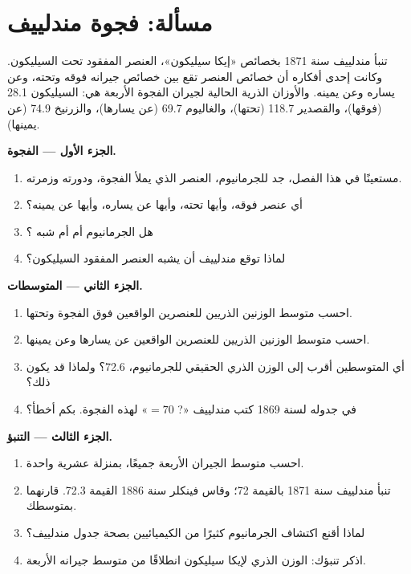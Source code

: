 \section{مسألة: فجوة مندلييف}

\begin{problem}
\label{pb:g9:periodic-table-first-look:1}
تنبأ مندلييف سنة 1871 بخصائص «إيكا سيليكون»، العنصر المفقود تحت السيليكون.
وكانت إحدى أفكاره أن خصائص العنصر تقع بين خصائص جيرانه فوقه وتحته، وعن
يساره وعن يمينه. والأوزان الذرية الحالية لجيران الفجوة الأربعة هي:
السيليكون 28.1 (فوقها)، والقصدير 118.7 (تحتها)، والغاليوم 69.7 (عن
يسارها)، والزرنيخ 74.9 (عن يمينها).

\medskip
\noindent\textbf{الجزء الأول --- الفجوة.}
\begin{enumerate}
  \item مستعينًا  في هذا الفصل، جد  للجرمانيوم،
        العنصر الذي يملأ الفجوة، ودورته
        وزمرته.
  \item أي عنصر فوقه، وأيها تحته، وأيها عن يساره، وأيها عن
        يمينه؟
  \item هل الجرمانيوم  أم  أم شبه ؟
  \item لماذا توقع مندلييف أن يشبه العنصر المفقود
        السيليكون؟
\end{enumerate}

\medskip
\noindent\textbf{الجزء الثاني --- المتوسطات.}
\begin{enumerate}[resume]
  \item احسب متوسط الوزنين الذريين للعنصرين الواقعين فوق الفجوة
        وتحتها.
  \item احسب متوسط الوزنين الذريين للعنصرين الواقعين عن يسارها وعن
        يمينها.
  \item أي المتوسطين أقرب إلى الوزن الذري الحقيقي للجرمانيوم، 72.6؟ ولماذا
        قد يكون ذلك؟
  \item في جدوله لسنة 1869 كتب مندلييف «? $= 70$» لهذه
        الفجوة. بكم أخطأ؟
\end{enumerate}

\medskip
\noindent\textbf{الجزء الثالث --- التنبؤ.}
\begin{enumerate}[resume]
  \item احسب متوسط الجيران الأربعة جميعًا، بمنزلة عشرية
        واحدة.
  \item تنبأ مندلييف سنة 1871 بالقيمة 72؛ وقاس فينكلر سنة 1886 القيمة 72.3.
        قارنهما بمتوسطك.
  \item لماذا أقنع اكتشاف الجرمانيوم كثيرًا من الكيميائيين بصحة جدول
        مندلييف؟
  \item اذكر تنبؤك: الوزن الذري لإيكا سيليكون انطلاقًا من متوسط جيرانه
        الأربعة.
\end{enumerate}
\end{problem}
